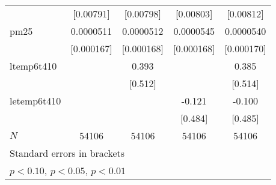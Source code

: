 {\begin{tabular}{l*{4}{c}}
            &   [0.00791]         &   [0.00798]         &   [0.00803]         &   [0.00812]         \\
[1em]
pm25        &   0.0000511         &   0.0000512         &   0.0000545         &   0.0000540         \\
            &  [0.000167]         &  [0.000168]         &  [0.000168]         &  [0.000170]         \\
[1em]
ltemp6t410  &                     &       0.393         &                     &       0.385         \\
            &                     &     [0.512]         &                     &     [0.514]         \\
[1em]
letemp6t410 &                     &                     &      -0.121         &      -0.100         \\
            &                     &                     &     [0.484]         &     [0.485]         \\
\hline
\(N\)       &       54106         &       54106         &       54106         &       54106         \\
\hline\hline
\multicolumn{5}{l}{\footnotesize Standard errors in brackets}\\
\multicolumn{5}{l}{\footnotesize \sym{*} \(p<0.10\), \sym{**} \(p<0.05\), \sym{***} \(p<0.01\)}\\
\end{tabular}
}
